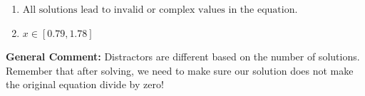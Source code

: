 \documentclass{extbook}[14pt]
\begin{document}
\begin{enumerate}
{\begin{enumerate}[label=\Alph*.]
* $x = -1.307 \text{ and } x = 1.530$, which is the correct option.
\item \( \text{All solutions lead to invalid or complex values in the equation.} \)


\item \( x \in [0.79,1.78] \)


\end{enumerate}

\textbf{General Comment:} Distractors are different based on the number of solutions. Remember that after solving, we need to make sure our solution does not make the original equation divide by zero!
}
\end{enumerate}
\end{document}
